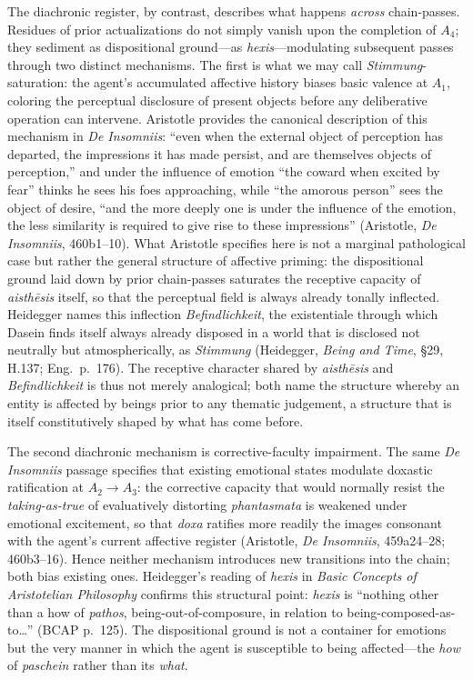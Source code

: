 \documentclass{article}
\begin{document}
The diachronic register, by contrast, describes what happens \textit{across} chain-passes. Residues of prior actualizations do not simply vanish upon the completion of $A_4$; they sediment as dispositional ground---as \textit{hexis}---modulating subsequent passes through two distinct mechanisms. The first is what we may call \textit{Stimmung}-saturation: the agent's accumulated affective history biases basic valence at $A_1$, coloring the perceptual disclosure of present objects before any deliberative operation can intervene. Aristotle provides the canonical description of this mechanism in \textit{De Insomniis}: ``even when the external object of perception has departed, the impressions it has made persist, and are themselves objects of perception,'' and under the influence of emotion ``the coward when excited by fear'' thinks he sees his foes approaching, while ``the amorous person'' sees the object of desire, ``and the more deeply one is under the influence of the emotion, the less similarity is required to give rise to these impressions'' (Aristotle, \textit{De Insomniis}, 460b1--10). What Aristotle specifies here is not a marginal pathological case but rather the general structure of affective priming: the dispositional ground laid down by prior chain-passes saturates the receptive capacity of \textit{aisthēsis} itself, so that the perceptual field is always already tonally inflected. Heidegger names this inflection \textit{Befindlichkeit}, the existentiale through which Dasein finds itself always already disposed in a world that is disclosed not neutrally but atmospherically, as \textit{Stimmung} (Heidegger, \textit{Being and Time}, \S 29, H.137; Eng.~p.~176). The receptive character shared by \textit{aisthēsis} and \textit{Befindlichkeit} is thus not merely analogical; both name the structure whereby an entity is affected by beings prior to any thematic judgement, a structure that is itself constitutively shaped by what has come before.

The second diachronic mechanism is corrective-faculty impairment. The same \textit{De Insomniis} passage specifies that existing emotional states modulate doxastic ratification at $A_2 \rightarrow A_3$: the corrective capacity that would normally resist the \textit{taking-as-true} of evaluatively distorting \textit{phantasmata} is weakened under emotional excitement, so that \textit{doxa} ratifies more readily the images consonant with the agent's current affective register (Aristotle, \textit{De Insomniis}, 459a24--28; 460b3--16). Hence neither mechanism introduces new transitions into the chain; both bias existing ones. Heidegger's reading of \textit{hexis} in \textit{Basic Concepts of Aristotelian Philosophy} confirms this structural point: \textit{hexis} is ``nothing other than a how of \textit{pathos}, being-out-of-composure, in relation to being-composed-as-to\ldots'' (BCAP p.~125). The dispositional ground is not a container for emotions but the very manner in which the agent is susceptible to being affected---the \textit{how} of \textit{paschein} rather than its \textit{what}.
\end{document}
